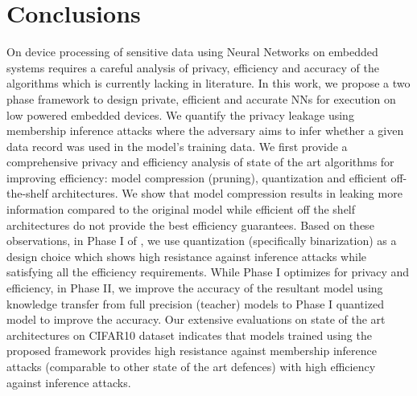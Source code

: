 \section{Conclusions}\label{conclusions}

On device processing of sensitive data using Neural Networks on embedded systems requires a careful analysis of privacy, efficiency and accuracy of the algorithms which is currently lacking in literature.
In this work, we propose a two phase \method\hspace{0.02in} framework to design private, efficient and accurate NNs for execution on low powered embedded devices.
We quantify the privacy leakage using membership inference attacks where the adversary aims to infer whether a given data record was used in the model's training data.
We first provide a comprehensive privacy and efficiency analysis of state of the art algorithms for improving efficiency: model compression (pruning), quantization and efficient off-the-shelf architectures.
We show that model compression results in leaking more information compared to the original model while efficient off the shelf architectures do not provide the best efficiency guarantees.
Based on these observations, in Phase I of \method, we use quantization (specifically binarization) as a design choice which shows high resistance against inference attacks while satisfying all the efficiency requirements.
While Phase I optimizes for privacy and efficiency, in Phase II, we improve the accuracy of the resultant model using knowledge transfer from full precision (teacher) models to Phase I quantized model to improve the accuracy.
Our extensive evaluations on state of the art architectures on CIFAR10 dataset indicates that models trained using the proposed framework provides high resistance against membership inference attacks (comparable to other state of the art defences) with high efficiency against inference attacks.
